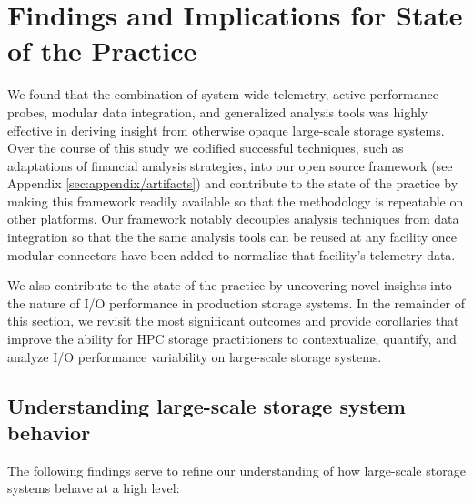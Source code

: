 \section{Findings and Implications for State of the Practice}
\label{sec:findings}

We found that the combination of system-wide telemetry, active performance
probes, modular data integration, and generalized analysis
tools was highly effective in deriving insight from otherwise
opaque large-scale storage systems.  Over the course of this study we
codified successful techniques, such as adaptations of financial analysis
strategies, into our open source \tokio framework
(see Appendix \ref{sec:appendix/artifacts}) and contribute to the state of
the practice by making this framework
readily available so that the methodology is repeatable on other platforms.  Our framework notably
decouples analysis techniques from data integration so that the
the same analysis tools can be reused at any facility once modular
connectors have been added to normalize that facility's telemetry data.

We also contribute to the state of the practice by uncovering novel
insights into the nature of I/O performance in production storage systems.
In the remainder of this section, we revisit the most significant outcomes and
provide corollaries that improve the ability for HPC storage practitioners
to contextualize, quantify, and analyze I/O performance variability on
large-scale storage systems.

\subsection{Understanding large-scale storage system behavior}

The following findings serve to refine our understanding of how large-scale storage
systems behave at a high level: 

